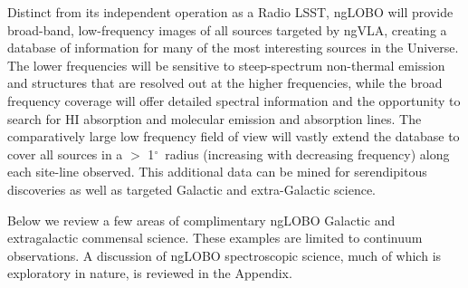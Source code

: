 \documentclass[11pt]{article}
\newcommand{\tododetail}{\todo[inline,color=green!40]}
\def\deg{$^\circ$}
\begin{document}

Distinct from its independent operation as a Radio LSST, ngLOBO will provide broad-band, low-frequency images of all sources targeted by ngVLA, creating a database of information for many of the most interesting sources in the Universe. The lower frequencies will be sensitive to steep-spectrum non-thermal emission and structures that are resolved out at the higher frequencies, while the broad frequency coverage will offer detailed spectral information and the opportunity to search for HI absorption and molecular emission and absorption lines. The comparatively large low frequency field of view will vastly extend the database to cover all sources in a $>$ 1\deg ~radius (increasing with decreasing frequency) along each site-line observed. This additional data can be mined for serendipitous discoveries as well as targeted Galactic and extra-Galactic science.


Below we review a few areas of complimentary ngLOBO Galactic and extragalactic commensal science. These examples are limited to continuum observations. A discussion of ngLOBO spectroscopic science, much of which is exploratory in nature, is reviewed in the Appendix. 

\end{document}
